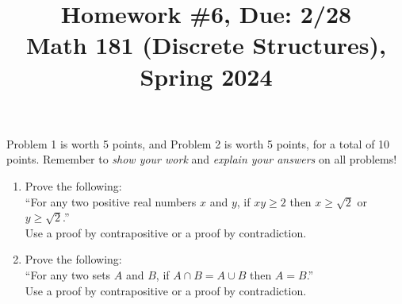 \documentclass[11pt]{article}
\title{Homework \#6, Due: 2/28 \\Math 181 (Discrete Structures), Spring 2024}
\date{}
\begin{document}
\maketitle

\thispagestyle{empty}

\vspace{-1cm}

Problem 1 is worth 5 points, and Problem 2 is worth 5 points, for a total of 10 points. Remember to \emph{show your work} and \emph{explain your answers} on all problems!

\begin{enumerate}
\item Prove the following: \\
``For any two positive real numbers $x$ and $y$, if $xy \geq 2$ then $x \geq \sqrt{2}$ or~$y \geq \sqrt{2}$.'' \\
Use a proof by contrapositive or a proof by contradiction.

\item Prove the following: \\
``For any two sets $A$ and $B$, if $A\cap B = A\cup B$ then $A=B$.'' \\
Use a proof by contrapositive or a proof by contradiction.
\end{enumerate}
\end{document}
